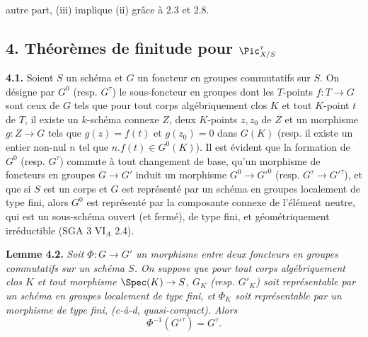 autre part, (iii) implique (ii) gr\^ace \`a 2.3 et 2.8.

\subsection*{4. Th\'eor\`emes de finitude pour $\Pic^\tau_{X/S}$}

\textbf{4.1.} Soient \(S\) un sch\'ema et \(G\) un foncteur en groupes commutatifs sur \(S\). On d\'esigne par \(G^0\) (resp. \(G^\tau\)) le sous-foncteur en groupes dont les \(T\)-points \(f:T\to G\) sont ceux de \(G\) tels que pour tout corps alg\'ebriquement clos \(K\) et tout \(K\)-point \(t\) de \(T\), il existe un \(k\)-sch\'ema connexe \(Z\), deux \(K\)-points \(z,z_0\) de \(Z\) et un morphisme \(g:Z\to G\) tels que \(g(z)=f(t)\) et \(g(z_0)=0\) dans \(G(K)\) (resp. il existe un entier non-nul \(n\) tel que \(n.f(t)\in G^0(K)\)). Il est \'evident que la formation de \(G^0\) (resp. \(G^\tau\)) commute \`a tout changement de base, qu'un morphisme de foncteurs en groupes \(G\to G'\) induit un morphisme \(G^0\to G'^0\) (resp. \(G^\tau\to G'^\tau\)), et que si \(S\) est un corps et \(G\) est repr\'esent\'e par un sch\'ema en groupes localement de type fini, alors \(G^0\) est repr\'esent\'e par la composante connexe de l'\'el\'ement neutre, qui est un sous-sch\'ema ouvert (et ferm\'e), de type fini, et g\'eom\'etriquement irr\'eductible (SGA 3 VI\(_A\) 2.4).

\textbf{Lemme 4.2.} \emph{Soit \(\Phi:G\to G'\) un morphisme entre deux foncteurs en groupes commutatifs sur un sch\'ema \(S\). On suppose que pour tout corps alg\'ebriquement clos \(K\) et tout morphisme \(\Spec(K)\to S\), \(G_K\) (resp. \(G'_K\)) soit repr\'esentable par un sch\'ema en groupes localement de type fini, et \(\Phi_K\) soit repr\'esentable par un morphisme de type fini, (c-\`a-d, quasi-compact). Alors}
\[
  \Phi^{-1}(G'^\tau)=G^\tau.
\]

